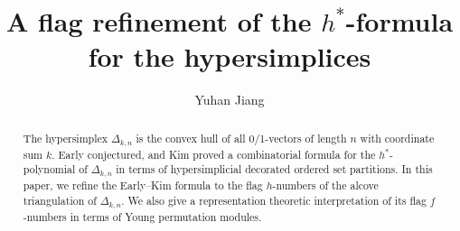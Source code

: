 \documentclass[12pt,reqno]{amsart}
\theoremstyle{plain}
\theoremstyle{definition}
\newcommand{\hyp}{\Delta_{k,n}}
\begin{document}
\title{A flag refinement of the $ h^* $-formula for the hypersimplices}
\author[Y. Jiang]{Yuhan Jiang}
\address{University of California, Berkeley}

\begin{abstract}
	The hypersimplex $ \hyp $
	is the convex hull of all 0/1-vectors of length $ n $ with coordinate sum $ k $.
	Early conjectured, and Kim proved a combinatorial formula for the $ h^* $-polynomial of $ \hyp $ in terms of hypersimplicial decorated ordered set partitions.
	In this paper, we refine the Early--Kim formula to the flag $h$-numbers of the alcove triangulation of $\hyp$. We also give a representation theoretic interpretation of its flag $f$-numbers in terms of Young permutation modules.
\end{abstract}

\maketitle
\end{document}
